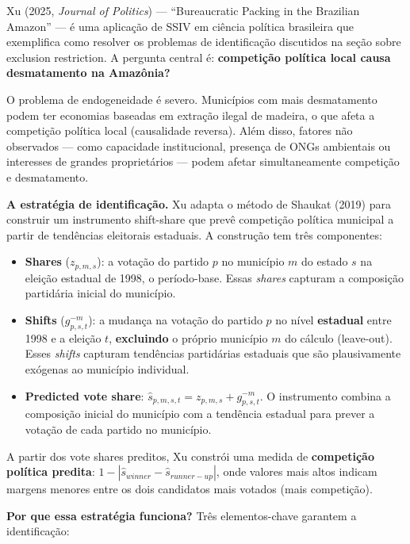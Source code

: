 \documentclass[
]{article}
\begin{document}
Xu (2025, \emph{Journal of Politics}) --- ``Bureaucratic Packing in the Brazilian Amazon'' --- é uma aplicação de SSIV em ciência política brasileira que exemplifica como resolver os problemas de identificação discutidos na seção sobre exclusion restriction. A pergunta central é: \textbf{competição política local causa desmatamento na Amazônia?}

O problema de endogeneidade é severo. Municípios com mais desmatamento podem ter economias baseadas em extração ilegal de madeira, o que afeta a competição política local (causalidade reversa). Além disso, fatores não observados --- como capacidade institucional, presença de ONGs ambientais ou interesses de grandes proprietários --- podem afetar simultaneamente competição e desmatamento.

\textbf{A estratégia de identificação.} Xu adapta o método de Shaukat (2019) para construir um instrumento shift-share que prevê competição política municipal a partir de tendências eleitorais estaduais. A construção tem três componentes:

\begin{itemize}
\item
  \textbf{Shares} (\(z_{p,m,s}\)): a votação do partido \(p\) no município \(m\) do estado \(s\) na eleição estadual de 1998, o período-base. Essas \emph{shares} capturam a composição partidária inicial do município.
\item
  \textbf{Shifts} (\(g_{p,s,t}^{-m}\)): a mudança na votação do partido \(p\) no nível \textbf{estadual} entre 1998 e a eleição \(t\), \textbf{excluindo} o próprio município \(m\) do cálculo (leave-out). Esses \emph{shifts} capturam tendências partidárias estaduais que são plausivamente exógenas ao município individual.
\item
  \textbf{Predicted vote share}: \(\hat{s}_{p,m,s,t} = z_{p,m,s} + g_{p,s,t}^{-m}\). O instrumento combina a composição inicial do município com a tendência estadual para prever a votação de cada partido no município.
\end{itemize}

A partir dos vote shares preditos, Xu constrói uma medida de \textbf{competição política predita}: \(1 - |\hat{s}_{winner} - \hat{s}_{runner-up}|\), onde valores mais altos indicam margens menores entre os dois candidatos mais votados (mais competição).

\textbf{Por que essa estratégia funciona?} Três elementos-chave garantem a identificação:
\end{document}
